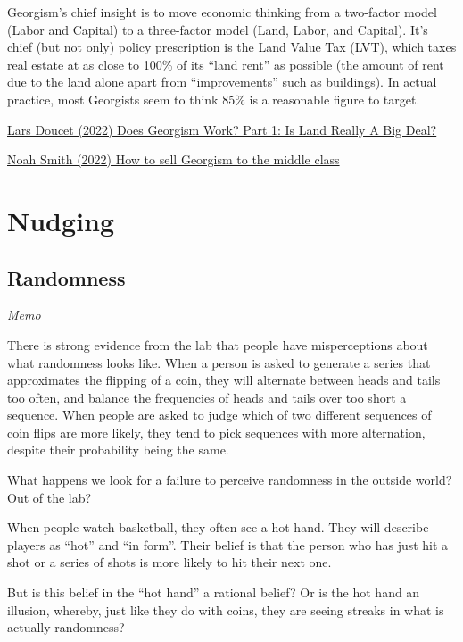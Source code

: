\documentclass[
]{book}
\begin{document}
Georgism's chief insight is to move economic thinking from a two-factor model (Labor and Capital) to a three-factor model (Land, Labor, and Capital). It's chief (but not only) policy prescription is the Land Value Tax (LVT), which taxes real estate at as close to 100\% of its ``land rent'' as possible (the amount of rent due to the land alone apart from ``improvements'' such as buildings). In actual practice, most Georgists seem to think 85\% is a reasonable figure to target.

\href{https://astralcodexten.substack.com/p/does-georgism-work-is-land-really}{Lars Doucet (2022) Does Georgism Work? Part 1: Is Land Really A Big Deal?}

\href{https://noahpinion.substack.com/p/how-to-sell-georgism-to-the-middle}{Noah Smith (2022) How to sell Georgism to the middle class}

\hypertarget{nudging}{%
\chapter{Nudging}\label{nudging}}

\hypertarget{randomness}{%
\section{Randomness}\label{randomness}}

\emph{Memo}

There is strong evidence from the lab that people have misperceptions about what randomness looks like. When a person is asked to generate a series that approximates the flipping of a coin, they will alternate between heads and tails too often, and balance the frequencies of heads and tails over too short a sequence. When people are asked to judge which of two different sequences of coin flips are more likely, they tend to pick sequences with more alternation, despite their probability being the same.

What happens we look for a failure to perceive randomness in the outside world? Out of the lab?

When people watch basketball, they often see a hot hand. They will describe players as ``hot'' and ``in form''. Their belief is that the person who has just hit a shot or a series of shots is more likely to hit their next one.

But is this belief in the ``hot hand'' a rational belief? Or is the hot hand an illusion, whereby, just like they do with coins, they are seeing streaks in what is actually randomness?
\end{document}
